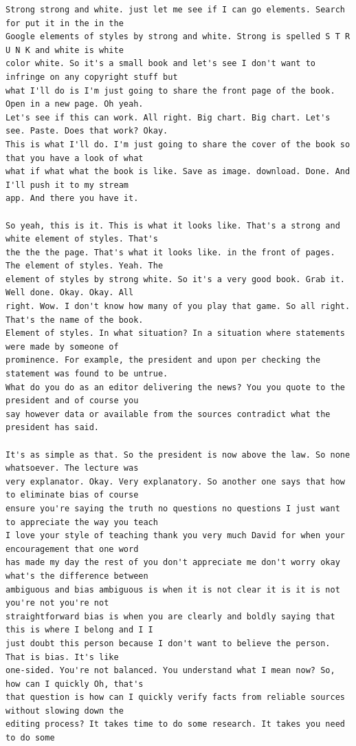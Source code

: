{\begin{Verbatim}
Strong strong and white. just let me see if I can go elements. Search for put it in the in the
Google elements of styles by strong and white. Strong is spelled S T R U N K and white is white
color white. So it's a small book and let's see I don't want to infringe on any copyright stuff but
what I'll do is I'm just going to share the front page of the book. Open in a new page. Oh yeah.
Let's see if this can work. All right. Big chart. Big chart. Let's see. Paste. Does that work? Okay.
This is what I'll do. I'm just going to share the cover of the book so that you have a look of what
what if what what the book is like. Save as image. download. Done. And I'll push it to my stream
app. And there you have it.

So yeah, this is it. This is what it looks like. That's a strong and white element of styles. That's
the the the page. That's what it looks like. in the front of pages. The element of styles. Yeah. The
element of styles by strong white. So it's a very good book. Grab it. Well done. Okay. Okay. All
right. Wow. I don't know how many of you play that game. So all right. That's the name of the book.
Element of styles. In what situation? In a situation where statements were made by someone of
prominence. For example, the president and upon per checking the statement was found to be untrue.
What do you do as an editor delivering the news? You you quote to the president and of course you
say however data or available from the sources contradict what the president has said.

It's as simple as that. So the president is now above the law. So none whatsoever. The lecture was
very explanator. Okay. Very explanatory. So another one says that how to eliminate bias of course
ensure you're saying the truth no questions no questions I just want to appreciate the way you teach
I love your style of teaching thank you very much David for when your encouragement that one word
has made my day the rest of you don't appreciate me don't worry okay what's the difference between
ambiguous and bias ambiguous is when it is not clear it is it is not you're not you're not
straightforward bias is when you are clearly and boldly saying that this is where I belong and I I
just doubt this person because I don't want to believe the person. That is bias. It's like
one-sided. You're not balanced. You understand what I mean now? So, how can I quickly Oh, that's
that question is how can I quickly verify facts from reliable sources without slowing down the
editing process? It takes time to do some research. It takes you need to do some


\end{Verbatim}}
